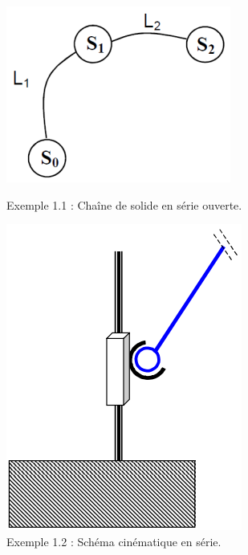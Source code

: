 \documentclass[12pt]{article}
\begin{document}
\begin{figure}
\begin{minipage}{.55\linewidth}

\centering
\includegraphics[width=0.7\linewidth]{serie1.PNG}
\caption{Exemple 1.1 : Chaîne de solide en série ouverte.}
\label{Se1}

\end{minipage}
\begin{minipage}{.44\linewidth}

\centering
\includegraphics[width=0.7\linewidth]{par1.PNG}
\caption{Exemple 1.2 : Schéma cinématique en série.}
\label{Par1}

\end{minipage}
\end{figure}
\end{document}
